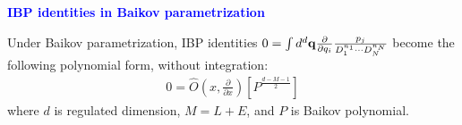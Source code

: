 \documentclass[10pt]{article}
\begin{document}
\textbf{\textcolor{blue}{IBP identities in Baikov parametrization}}

Under Baikov parametrization, IBP identities $0 = \int d^d \bold{q} \frac{\partial }{\partial q_i} \frac{p_j}{D_1^{n_1} \cdots D_N^{n_N}}$ become the following polynomial form, without integration:
\begin{eqnarray}
\nonumber
0= \hat{O}\left(x, \frac{\partial}{\partial x}\right) \left[ P ^{\frac{d-M-1}{2}} \right]
\end{eqnarray}
where $d$ is regulated dimension, $M=L+E$, and $P$ is Baikov polynomial.
\end{document}
